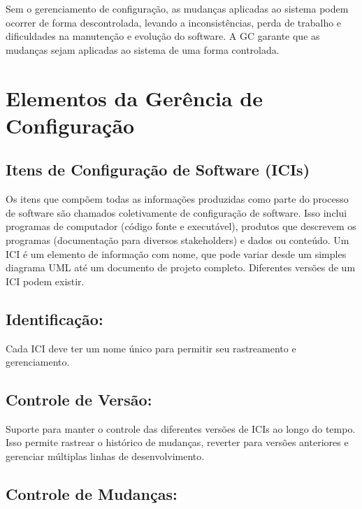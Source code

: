 \documentclass[
]{book}
\begin{document}
Sem o gerenciamento de configuração, as mudanças aplicadas ao sistema podem ocorrer de forma descontrolada, levando a inconsistências, perda de trabalho e dificuldades na manutenção e evolução do software. A GC garante que as mudanças sejam aplicadas ao sistema de uma forma controlada.

\section{Elementos da Gerência de Configuração}\label{elementos-da-geruxeancia-de-configurauxe7uxe3o}

\subsection{Itens de Configuração de Software (ICIs)}\label{itens-de-configurauxe7uxe3o-de-software-icis}

Os itens que compõem todas as informações produzidas como parte do processo de software são chamados coletivamente de configuração de software. Isso inclui programas de computador (código fonte e executável), produtos que descrevem os programas (documentação para diversos stakeholders) e dados ou conteúdo. Um ICI é um elemento de informação com nome, que pode variar desde um simples diagrama UML até um documento de projeto completo. Diferentes versões de um ICI podem existir.

\subsection{Identificação:}\label{identificauxe7uxe3o}

Cada ICI deve ter um nome único para permitir seu rastreamento e gerenciamento.

\subsection{Controle de Versão:}\label{controle-de-versuxe3o}

Suporte para manter o controle das diferentes versões de ICIs ao longo do tempo. Isso permite rastrear o histórico de mudanças, reverter para versões anteriores e gerenciar múltiplas linhas de desenvolvimento.

\subsection{Controle de Mudanças:}\label{controle-de-mudanuxe7as}
\end{document}
